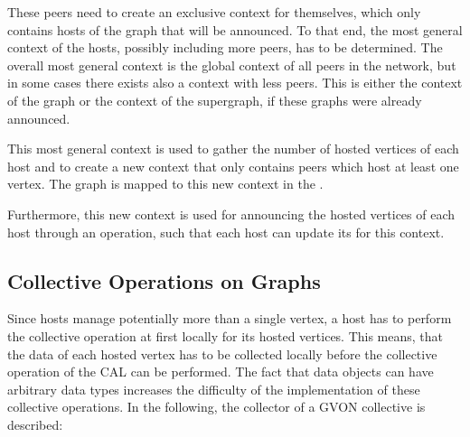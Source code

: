 These peers need to create an exclusive context for
themselves, which only contains hosts of the graph that will be
announced.  To that end, the most general context of the hosts, possibly
including more peers, has to be determined.  The overall most general
context is the global context of all peers in the network, but in some
cases there exists also a context with less peers.  This is either the
context of the graph or the context of the supergraph, if these graphs
were already announced.

This most general context is used to gather the number of hosted
vertices of each host and to create a new context that only contains
peers which host at least one vertex. The graph is mapped to this new
context in the .

Furthermore, this new context is used for announcing the hosted
vertices of each host through an  operation, such that
each host can update its  for this context.

\subsection{Collective Operations on Graphs}
\label{sec:gvon_collective}

Since hosts manage potentially more than a single vertex, a host has
to perform the collective operation at first locally for its hosted
vertices. This means, that the data of each hosted vertex has to be
collected locally before the collective operation of the CAL can be
performed. The fact that data objects can have arbitrary data types
increases the difficulty of the implementation of these collective
operations.  In the following, the collector of a GVON collective is
described:

